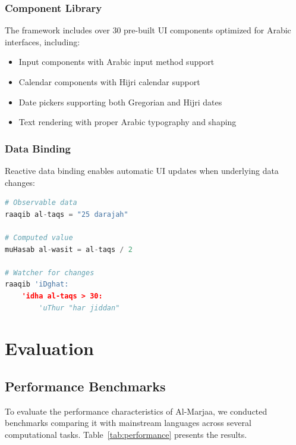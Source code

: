 \documentclass[11pt,a4paper]{article}
\begin{document}
\subsubsection{Component Library}

The framework includes over 30 pre-built UI components optimized for Arabic interfaces, including:

\begin{itemize}
    \item Input components with Arabic input method support
    \item Calendar components with Hijri calendar support
    \item Date pickers supporting both Gregorian and Hijri dates
    \item Text rendering with proper Arabic typography and shaping
\end{itemize}

\subsubsection{Data Binding}

Reactive data binding enables automatic UI updates when underlying data changes:

\begin{lstlisting}[language=Python, caption=Data Binding Example]
# Observable data
raaqib al-taqs = "25 darajah"

# Computed value
muHasab al-wasit = al-taqs / 2

# Watcher for changes
raaqib 'iDghat:
    'idha al-taqs > 30:
        'uThur "har jiddan"
\end{lstlisting}

\section{Evaluation}

\subsection{Performance Benchmarks}

To evaluate the performance characteristics of Al-Marjaa, we conducted benchmarks comparing it with mainstream languages across several computational tasks. Table~\ref{tab:performance} presents the results.
\end{document}
